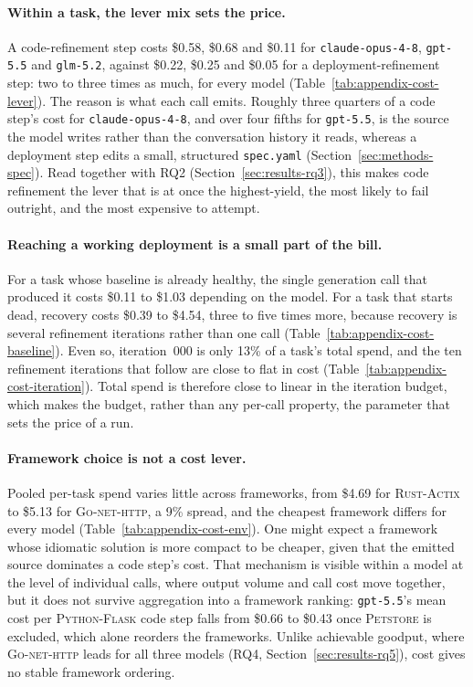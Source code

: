 \paragraph{Within a task, the lever mix sets the price.} A code-refinement
step costs \$0.58, \$0.68 and \$0.11 for \texttt{claude-opus-4-8},
\texttt{gpt-5.5} and \texttt{glm-5.2}, against \$0.22, \$0.25 and \$0.05
for a deployment-refinement step: two to three times as much, for every
model (Table~\ref{tab:appendix-cost-lever}). The reason is what each call
emits. Roughly three quarters of a code step's cost for
\texttt{claude-opus-4-8}, and over four fifths for \texttt{gpt-5.5}, is
the source the model writes rather than the conversation history it reads,
whereas a deployment step edits a small, structured \texttt{spec.yaml}
(Section~\ref{sec:methods-spec}). Read together with RQ2
(Section~\ref{sec:results-rq3}), this makes code refinement the lever that
is at once the highest-yield, the most likely to fail outright, and the
most expensive to attempt.

\paragraph{Reaching a working deployment is a small part of the bill.}
For a task whose baseline is already healthy, the single generation call
that produced it costs \$0.11 to \$1.03 depending on the model. For a task
that starts dead, recovery costs \$0.39 to \$4.54, three to five times
more, because recovery is several refinement iterations rather than one
call (Table~\ref{tab:appendix-cost-baseline}). Even so, iteration~000 is
only 13\% of a task's total spend, and the ten refinement iterations that
follow are close to flat in cost
(Table~\ref{tab:appendix-cost-iteration}). Total spend is therefore close
to linear in the iteration budget, which makes the budget, rather than any
per-call property, the parameter that sets the price of a run.

\paragraph{Framework choice is not a cost lever.} Pooled per-task spend
varies little across frameworks, from \$4.69 for \textsc{Rust-Actix} to
\$5.13 for \textsc{Go-net-http}, a 9\% spread, and the cheapest framework
differs for every model (Table~\ref{tab:appendix-cost-env}). One might
expect a framework whose idiomatic solution is more compact to be cheaper,
given that the emitted source dominates a code step's cost. That mechanism
is visible within a model at the level of individual calls, where output
volume and call cost move together, but it does not survive aggregation
into a framework ranking: \texttt{gpt-5.5}'s mean cost per
\textsc{Python-Flask} code step falls from \$0.66 to \$0.43 once
\textsc{Petstore} is excluded, which alone reorders the frameworks. Unlike
achievable goodput, where \textsc{Go-net-http} leads for all three models
(RQ4, Section~\ref{sec:results-rq5}), cost gives no stable framework
ordering.

